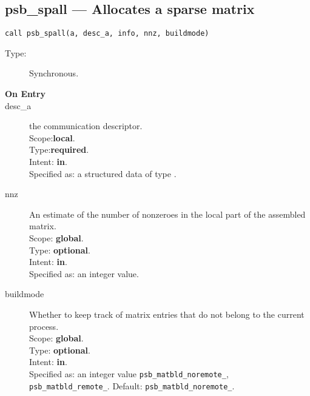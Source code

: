 


%
%
\clearpage\subsection{psb\_spall --- Allocates a sparse matrix}

\begin{verbatim}
call psb_spall(a, desc_a, info, nnz, buildmode)
\end{verbatim}

\begin{description}
\item[Type:] Synchronous.
\item[\bf On Entry]
\item[desc\_a] the communication descriptor.\\
Scope:{\bf local}.\\
Type:{\bf required}.\\
Intent: {\bf in}.\\
Specified as: a structured data of type \descdata.
\item[nnz] An estimate of the number of nonzeroes in the local
  part of the assembled matrix.\\ 
Scope: {\bf global}.\\
Type: {\bf optional}.\\
Intent: {\bf in}.\\
Specified as: an integer value. 
\item[buildmode] Whether to keep track of matrix entries that do not
  belong to the current process.\\ 
Scope: {\bf global}.\\
Type: {\bf optional}.\\
Intent: {\bf in}.\\
Specified as: an integer value \verb|psb_matbld_noremote_|,
\verb|psb_matbld_remote_|.  Default:  \verb|psb_matbld_noremote_|.
\end{description}

